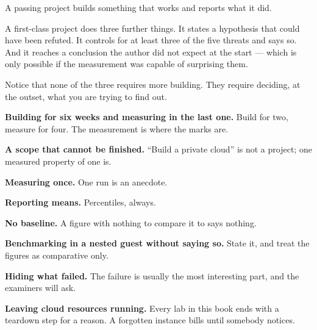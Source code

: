 \begin{conceptbox}
A passing project builds something that works and reports what it did.

\smallskip
A first-class project does three further things. It states a hypothesis that
could have been refuted. It controls for at least three of the five threats
and says so. And it reaches a conclusion the author did not expect at the
start --- which is only possible if the measurement was capable of surprising
them.

\smallskip
Notice that none of the three requires more building. They require deciding, at
the outset, what you are trying to find out.
\end{conceptbox}

\begin{pitfall}
\begin{tight}
  \item \textbf{Building for six weeks and measuring in the last one.} Build
        for two, measure for four. The measurement is where the marks are.
  \item \textbf{A scope that cannot be finished.} ``Build a private cloud'' is
        not a project; one measured property of one is.
  \item \textbf{Measuring once.} One run is an anecdote.
  \item \textbf{Reporting means.} Percentiles, always.
  \item \textbf{No baseline.} A figure with nothing to compare it to says
        nothing.
  \item \textbf{Benchmarking in a nested guest without saying so.} State it,
        and treat the figures as comparative only.
  \item \textbf{Hiding what failed.} The failure is usually the most
        interesting part, and the examiners will ask.
  \item \textbf{Leaving cloud resources running.} Every lab in this book ends
        with a teardown step for a reason. A forgotten instance bills until
        somebody notices.
\end{tight}
\end{pitfall}

